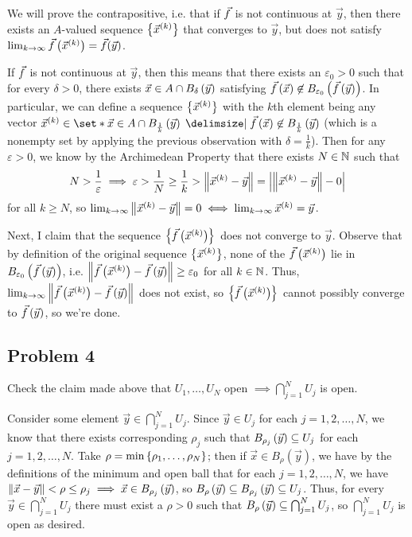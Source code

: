 \documentclass[main.tex]{subfiles}
\begin{document}
\begin{soln}
    We will prove the contrapositive, i.e. that if $\vec{f}$ is not continuous at $\vec{y}$, then there exists an $A$-valued sequence $\left\{ \vec{x}^{(k)} \right\}$ that converges to $\vec{y}$, but does not satisfy $\lim_{k\to \infty} \vec{f}\left( \vec{x}^{(k)} \right) = \vec{f}(\vec{y})$.
    
    If $\vec{f}$ is not continuous at $\vec{y}$, then this means that there exists an $\varepsilon_0 > 0$ such that for every $\delta > 0$, there exists $\vec{x} \in A \cap B_\delta\left( \vec{y} \right)$ satisfying $\vec{f}\left( \vec{x} \right) \not\in B_{\varepsilon_0}\left( \vec{f}\left( \vec{y} \right) \right)$. In particular, we can define a sequence $\left\{ \vec{x}^{(k)} \right\}$ with the $k$th element being any vector $\vseq{x}\in \set*{\vec{x} \in A\cap B_{\frac{1}{k}}\parens{\vec{y}} \mid \vf\parens{\vec{x}} \not\in B_{\frac{1}{k}}\parens{\vec{y}}}$ (which is a nonempty set by applying the previous observation with $\delta = \frac{1}{k}$). Then for any $\varepsilon > 0$, we know by the Archimedean Property that there exists $N\in \mathbb N$ such that 
    \[N > \frac{1}{\varepsilon}\implies \varepsilon > \frac{1}{N}\ge \frac{1}{k} > \left\lVert \vec{x}^{(k)} - \vec{y} \right\rVert = \left\lvert \left\lVert \vec{x}^{(k)} - \vec{y} \right\rVert - 0 \right\rvert\]
    for all $k\ge N$, so $\lim_{k\to \infty}\left\lVert \vec{x}^{(k)} - \vec{y} \right\rVert = 0\iff \lim_{k\to \infty} \vec{x}^{(k)} = \vec{y}$.

    Next, I claim that the sequence $\left\{ \vec{f}\left( \vec{x}^{(k)} \right) \right\}$ does not converge to $\vec{y}$. Observe that by definition of the original sequence $\left\{ \vec{x}^{(k)} \right\}$, none of the $\vec{f}\left( \vec{x}^{(k)} \right)$ lie in $B_{\varepsilon_0}\left( \vec{f}\left( \vec{y} \right) \right)$, i.e. $\left\lVert \vec{f}\left( \vec{x}^{(k)} \right) - \vec{f}\left( \vec{y} \right) \right\rVert\ge \varepsilon_0$ for all $k\in \mathbb N$. Thus, $\lim_{k\to \infty} \left\lVert \vec{f}\left( \vec{x}^{(k)} \right) - \vec{f}\left( \vec{y} \right) \right\rVert$ does not exist, so $\left\{ \vec{f}\left( \vec{x}^{(k)} \right) \right\}$ cannot possibly converge to $\vec{f}\left( \vec{y} \right)$, so we're done.
\end{soln}
\eject

\subsection{Problem 4}
\begin{claim}
    Check the claim made above that $U_1, \ldots ,U_N$ open $\implies \bigcap^N_{j=1}U_j$ is open.
\end{claim}

\begin{soln}
    Consider some element $\vec{y}\in \bigcap^N_{j=1}U_j$. Since $\vec{y}\in U_j$ for each $j = 1, 2, \ldots , N$, we know that there exists corresponding $\rho_j$ such that $B_{\rho_j}\left( \vec{y} \right)\subseteq U_j$ for each $j = 1, 2, \ldots , N$. Take $\rho = \min\left\{ \rho_1, \ldots , \rho_N \right\}$; then if $\vec{x}\in B_\rho(\vec{y})$, we have by the definitions of the minimum and open ball that for each $j = 1, 2, \ldots , N$, we have $\left\lVert \vec{x} - \vec{y} \right\rVert < \rho \le \rho_j\implies \vec{x}\in B_{\rho_j}\left( \vec{y} \right)$, so $B_\rho\left( \vec{y} \right)\subseteq B_{\rho_j}\left( \vec{y} \right)\subseteq U_j$. Thus, for every $\vec{y}\in \bigcap^N_{j=1}U_j$ there must exist a $\rho > 0$ such that $B_\rho\left( \vec{y} \right)\subseteq \bigcap^N_{j=1}U_j$, so $\bigcap^N_{j=1}U_j$ is open as desired.
\end{soln}
\eject
\end{document}
